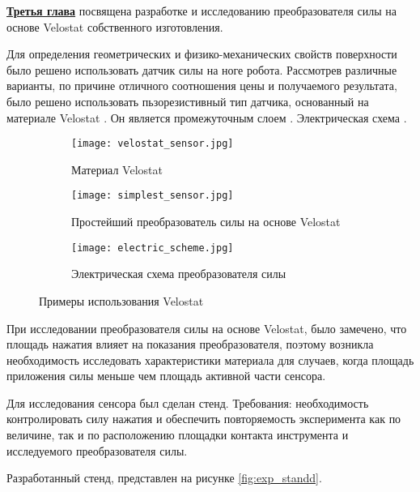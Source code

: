 
\textbf{\underline{Третья глава}} посвящена разработке и исследованию преобразователя силы на основе Velostat собственного изготовления.

Для определения геометрических и физико-механических свойств поверхности было решено использовать датчик силы на ноге робота. Рассмотрев различные варианты, по причине отличного соотношения цены и получаемого результата, было решено использовать пьзорезистивный тип датчика, основанный на материале Velostat . Он является промежуточным слоем . Электрическая схема . 


\begin{figure}[ht]
    \begin{subfigure}[t]{0.33\textwidth}
        \centering\texttt{[image: velostat\_sensor.jpg]}
        \caption{Материал Velostat}
        \label{fig:velostat_sensor.jpg}
    \end{subfigure}
    \begin{subfigure}[t]{0.33\textwidth}
        \centering\texttt{[image: simplest\_sensor.jpg]}
        \caption{Простейший преобразователь силы на основе Velostat}
        \label{fig:simplest_sensor.jpg}
    \end{subfigure}
    \begin{subfigure}[t]{0.33\textwidth}
        \centering\texttt{[image: electric\_scheme.jpg]}\\
        \caption{Электрическая схема преобразователя силы}
        \label{fig:el_scheme}
    \end{subfigure}
    \caption{Примеры использования Velostat}
\end{figure}

При исследовании преобразователя силы на основе Velostat, было замечено, что площадь нажатия влияет на показания преобразователя, поэтому возникла необходимость исследовать характеристики материала для случаев, когда площадь приложения силы меньше чем площадь активной части сенсора.

Для исследования сенсора был сделан стенд. Требования: необходимость контролировать силу нажатия и обеспечить повторяемость эксперимента как по величине, так и по расположению площадки контакта инструмента и исследуемого преобразователя силы. 

Разработанный стенд, представлен на рисунке \ref{fig:exp_standd}.

